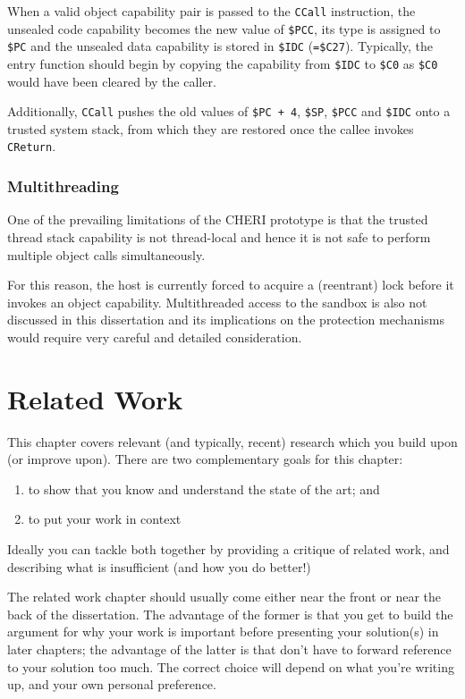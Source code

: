 \documentclass[a4paper,12pt,twoside,openright]{report}
\newcommand{\reg}[1]{\texttt{\$#1}}
\newcommand{\insn}[1]{\texttt{#1}}
\begin{document}
When a valid object capability pair is passed to the \insn{CCall} instruction, the unsealed code capability becomes the new value of \reg{PCC}, its type is assigned to \reg{PC} and the unsealed data capability is stored in \reg{IDC} (\texttt{=\reg{C27}}). Typically, the entry function should begin by copying the capability from \reg{IDC} to \reg{C0} as \reg{C0} would have been cleared by the caller.

Additionally, \insn{CCall} pushes the old values of \texttt{\reg{PC}~+~4}, \reg{SP}, \reg{PCC} and \reg{IDC} onto a trusted system stack, from which they are restored once the callee invokes \insn{CReturn}.

\subsection{Multithreading}

One of the prevailing limitations of the CHERI prototype is that the trusted thread stack capability is not thread-local and hence it is not safe to perform multiple object calls simultaneously. 

For this reason, the host is currently forced to acquire a (reentrant) lock before it invokes an object capability. Multithreaded access to the sandbox is also not discussed in this dissertation and its implications on the protection mechanisms would require very careful and detailed consideration.

\chapter{Related Work} 

This chapter covers relevant (and typically, recent) research 
which you build upon (or improve upon). There are two complementary 
goals for this chapter: 
\begin{enumerate} 
  \item to show that you know and understand the state of the art; and 
  \item to put your work in context
\end{enumerate} 

Ideally you can tackle both together by providing a critique of
related work, and describing what is insufficient (and how you do
better!)

The related work chapter should usually come either near the front or
near the back of the dissertation. The advantage of the former is that
you get to build the argument for why your work is important before
presenting your solution(s) in later chapters; the advantage of the
latter is that don't have to forward reference to your solution too
much. The correct choice will depend on what you're writing up, and
your own personal preference.
\end{document}

